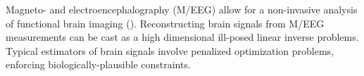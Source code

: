 Magneto- and electroencephalography (M/EEG) allow for a non-invasive analysis of functional brain imaging (\cite{Baillet_Mosher_Leahy_2001}).
Reconstructing brain signals from M/EEG measurements can be cast as a high dimensional ill-posed linear inverse problems.
Typical estimators of brain signals involve penalized optimization problems, enforcing biologically-plausible constraints.


